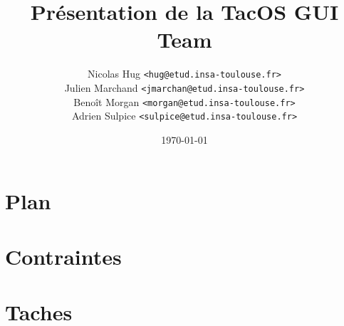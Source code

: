 \documentclass[12pt]{beamer}
\title{Présentation de la TacOS GUI Team}
\author{Nicolas Hug \texttt{<hug@etud.insa-toulouse.fr>}\\
Julien Marchand \texttt{<jmarchan@etud.insa-toulouse.fr>}\\
Benoît Morgan \texttt{<morgan@etud.insa-toulouse.fr>}\\
Adrien Sulpice \texttt{<sulpice@etud.insa-toulouse.fr>}}
\institute{INSA de Toulouse}
\date{\today}
\begin{document}

\frame{\titlepage}

\section[Plan]{Plan}
\frame{\tableofcontents}

\section{Contraintes}

\section{Taches}

\end{document}
